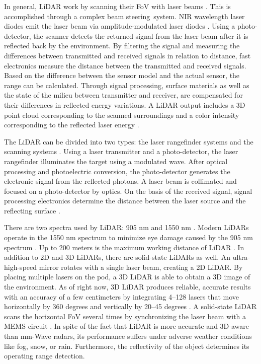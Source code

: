 \documentclass[a4paper,12pt]{article}
\begin{document}
\begin{itemize}
\hspace{5mm} In general, LiDAR work by scanning their FoV with laser beams \cite{article27}. This is accomplished through a complex beam steering system. NIR wavelength laser diodes emit the laser beam via amplitude-modulated laser diodes \cite{article27}. Using a photo-detector, the scanner detects the returned signal from the laser beam after it is reflected back by the environment. By filtering the signal and measuring the differences between transmitted and received signals in relation to distance, fast electronics measure the distance between the transmitted and received signals. Based on the difference between the sensor model and the actual sensor, the range can be calculated. Through signal processing, surface materials as well as the state of the milieu between transmitter and receiver, are compensated for their differences in reflected energy variations. A LiDAR output includes a 3D point cloud corresponding to the scanned surroundings and a color intensity corresponding to the reflected laser energy \cite{article27}.

\hspace{5mm} The LiDAR can be divided into two types: the laser rangefinder systems and the scanning systems \cite{article27}. Using a laser transmitter and a photo-detector, the laser rangefinder illuminates the target using a modulated wave. After optical processing and photoelectric conversion, the photo-detector generates the electronic signal from the reflected photons. A laser beam is collimated and focused on a photo-detector by optics. On the basis of the received signal, signal processing electronics determine the distance between the laser source and the reflecting surface \cite{article27}.

\hspace{5mm} There are two spectra used by LiDAR: 905 nm and 1550 nm \cite{article24}. Modern LiDARs operate in the 1550 nm spectrum to minimize eye damage caused by the 905 nm spectrum \cite{article24}. Up to 200 meters is the maximum working distance of LiDAR \cite{article24}. In addition to 2D and 3D LiDARs, there are solid-state LiDARs as well. An ultra-high-speed mirror rotates with a single laser beam, creating a 2D LiDAR. By placing multiple lasers on the pod, a 3D LiDAR is able to obtain a 3D image of the environment. As of right now, 3D LiDAR produces reliable, accurate results with an accuracy of a few centimeters by integrating 4–128 lasers that move horizontally by 360 degrees and vertically by 20–45 degrees \cite{article24}. A solid-state LiDAR scans the horizontal FoV several times by synchronizing the laser beam with a MEMS circuit \cite{article24}. In spite of the fact that LiDAR is more accurate and 3D-aware than mm-Wave radars, its performance suffers under adverse weather conditions like fog, snow, or rain. Furthermore, the reflectivity of the object determines its operating range detection.


\end{itemize}
\end{document}
